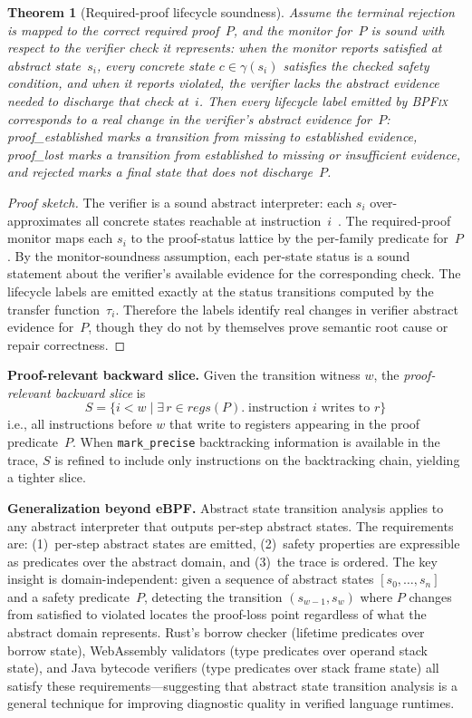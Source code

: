 \documentclass[sigplan,10pt,anonymous,review]{acmart}
\newcommand{\sys}{\textsc{BPFix}\xspace}
\newtheorem{theorem}{Theorem}
\begin{document}
\begin{theorem}[Required-proof lifecycle soundness]
\label{thm:required-proof-soundness}
Assume the terminal rejection is mapped to the correct required proof~$P$, and
the monitor for~$P$ is sound with respect to the verifier check it represents:
when the monitor reports \textit{satisfied} at abstract state~$s_i$, every
concrete state $c \in \gamma(s_i)$ satisfies the checked safety condition, and
when it reports \textit{violated}, the verifier lacks the abstract evidence
needed to discharge that check at~$i$.  Then every lifecycle label emitted by
\sys corresponds to a real change in the verifier's abstract evidence for~$P$:
\textit{proof\_established} marks a transition from missing to established
evidence, \textit{proof\_lost} marks a transition from established to missing or
insufficient evidence, and \textit{rejected} marks a final state that does not
discharge~$P$.
\end{theorem}
\begin{proof}[Proof sketch]
The verifier is a sound abstract interpreter: each $s_i$ over-approximates all
concrete states reachable at instruction~$i$~\cite{gershuni2019simple}.  The
required-proof monitor maps each $s_i$ to the proof-status lattice by the
per-family predicate for~$P$.  By the monitor-soundness assumption, each
per-state status is a sound statement about the verifier's available evidence
for the corresponding check.  The lifecycle labels are emitted exactly at the
status transitions computed by the transfer function~$\tau_i$.  Therefore the
labels identify real changes in verifier abstract evidence for~$P$, though they
do not by themselves prove semantic root cause or repair correctness.
\end{proof}

\textbf{Proof-relevant backward slice.}
Given the transition witness $w$, the \emph{proof-relevant backward slice} is
\[
  S = \{ i < w \mid \exists\, r \in \mathit{regs}(P) .\;
    \text{instruction } i \text{ writes to } r \}
\]
i.e., all instructions before $w$ that write to registers appearing in the
proof predicate~$P$.  When \texttt{mark\_precise} backtracking
information is available in the trace, $S$ is refined to include only
instructions on the backtracking chain, yielding a tighter slice.

\textbf{Generalization beyond eBPF.}
Abstract state transition analysis applies to any abstract interpreter that
outputs per-step abstract states.  The requirements are:
(1)~per-step abstract states are emitted,
(2)~safety properties are expressible as predicates over the abstract domain,
and (3)~the trace is ordered.
The key insight is domain-independent: given a sequence of abstract states
$[s_0, \ldots, s_n]$ and a safety predicate~$P$, detecting the transition
$(s_{w-1}, s_w)$ where $P$ changes from satisfied to violated locates the
proof-loss point regardless of what the abstract domain represents.
Rust's borrow checker (lifetime predicates over borrow state), WebAssembly
validators (type predicates over operand stack state), and Java bytecode
verifiers (type predicates over stack frame state) all satisfy these
requirements---suggesting that abstract state transition analysis is a
general technique for improving diagnostic quality in verified language
runtimes.
\end{document}
